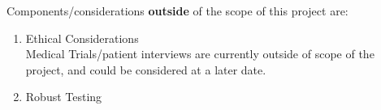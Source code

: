Components/considerations \textbf{outside} of the scope of this project are:

\begin{enumerate}
    \item Ethical Considerations \hfill \\
    Medical Trials/patient interviews are currently outside of scope of the project, and could be considered at a later date.
    \item Robust Testing \hfill \\
\end{enumerate}

